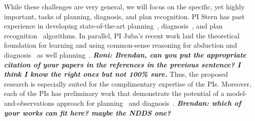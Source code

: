 \documentclass[12pt]{article}
\newcommand{\note}[1]{\textbf{\textit{#1}}}
\begin{document}
While these challenges are very  general, we will focus on the specific, yet highly important, tasks of planning, diagnosis, and plan recognition. PI Stern has past experience in developing state-of-the-art planning~\cite{felner2004pha,sharon2013increasing,sharon2015conflict,goldenberg2014enhanced,stern2014potential,maliah2016collaborative}, diagnosis~\cite{stern2012exploring,stern2014model,stern2014hierarchical}, and plan recognition~\cite{mirsky2016sequential} algorithms. 
In parallel, PI Juba's recent work laid the theoretical foundation for learning and using common-sense reasoning for abduction and diagnosis~\cite{yourAAAI'16paper} as well planning~\cite{yourPOMPDJMLRpaper}. \note{Roni: Brendan, can you put the appropriate citation of your papers in the references in the previous sentence? I think I know the right ones but not 100\% sure.}
Thus, the proposed research is especially suited for the complimentary expertise of the PIs. %
Moreover, each of the PIs has preliminary work that demonstrate the potential of a model-and-observations approach for planning~\cite{stern2011probably,stern2012exploring,juba2016jmlr} and diagnosis~\cite{elmishali2016dataAugmented}.
\note{Brendan: which of your works can fit here? maybe the NDDS one?}
\end{document}

